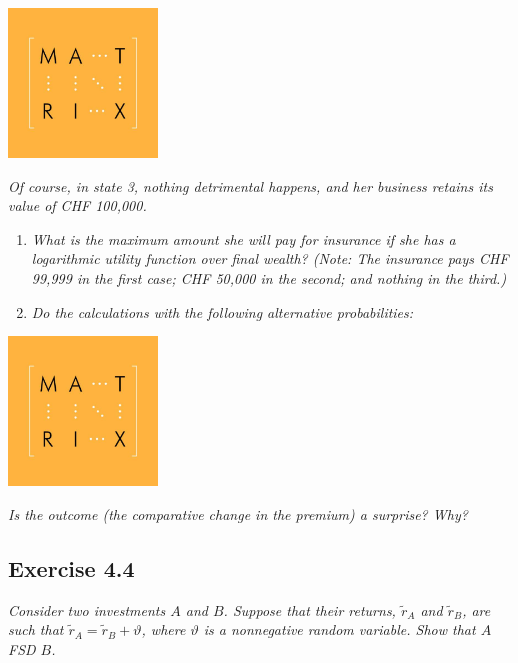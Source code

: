 \documentclass[]{book}
\theoremstyle{definition}
\theoremstyle{definition}
\theoremstyle{remark}
\begin{document}
\begin{center}\includegraphics[width=150px]{figures/matrix} \end{center}

\emph{Of course, in state 3, nothing detrimental happens, and her
business retains its value of CHF 100,000.}
\citep[p.7]{exercises_danthine}

\begin{enumerate}
\def\labelenumi{\alph{enumi}.}
\item
  \emph{What is the maximum amount she will pay for insurance if she has
  a logarithmic utility function over final wealth? (Note: The insurance
  pays CHF 99,999 in the first case; CHF 50,000 in the second; and
  nothing in the third.)} \citep[p.7]{exercises_danthine}
\item
  \emph{Do the calculations with the following alternative
  probabilities:} \citep[p.7]{exercises_danthine}
\end{enumerate}

\begin{center}\includegraphics[width=150px]{figures/matrix} \end{center}

\emph{Is the outcome (the comparative change in the premium) a surprise?
Why?} \citep[p.7]{exercises_danthine}

\subsection{Exercise 4.4}\label{exercise-4.4}

\emph{Consider two investments \(A\) and \(B\). Suppose that their
returns, \(\tilde{r}_A\) and \(\tilde{r}_B\), are such that
\(\tilde{r}_A=\tilde{r}_B+\vartheta\), where \(\vartheta\) is a
nonnegative random variable. Show that \(A\) FSD \(B\).}
\citep[p.7]{exercises_danthine}
\end{document}
